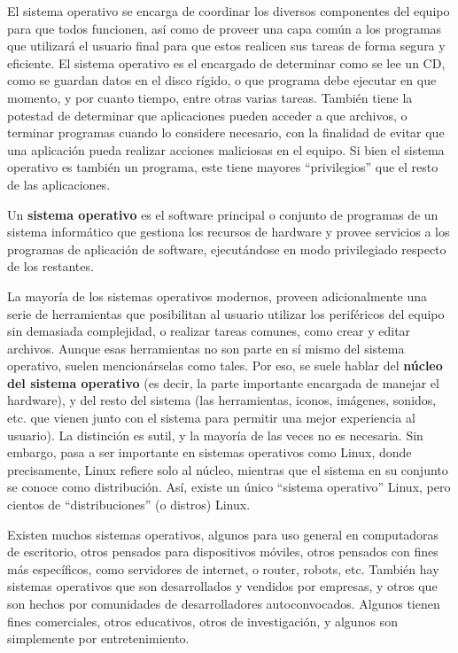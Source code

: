 El sistema operativo se encarga de coordinar los diversos componentes del equipo
para que todos funcionen, así como de proveer una capa común a los programas que
utilizará el usuario final para que estos realicen sus tareas de forma segura y
eficiente. El sistema operativo es el encargado de determinar como se lee un CD,
como se guardan datos en el disco rígido, o que programa debe ejecutar en que
momento, y por cuanto tiempo, entre otras varias tareas. También tiene la
potestad de determinar que aplicaciones pueden acceder a que archivos, o
terminar programas cuando lo considere necesario, con la finalidad de evitar que
una aplicación pueda realizar acciones maliciosas en el equipo. Si bien el
sistema operativo es también un programa, este tiene mayores ``privilegios'' que
el resto de las aplicaciones.

\begin{definition} Un \textbf{sistema operativo} es el
    software principal o conjunto de programas de un sistema informático que
    gestiona los recursos de hardware y provee servicios a los programas de
    aplicación de software, ejecutándose en modo privilegiado respecto de los
    restantes.
    \autocite[cft.]{tanenbaum_2007, turner_1986}
\end{definition}

La mayoría de los sistemas operativos modernos, proveen adicionalmente una serie
de herramientas que posibilitan al usuario utilizar los periféricos del equipo
sin demasiada complejidad, o realizar tareas comunes, como crear y editar
archivos. Aunque esas herramientas no son parte en sí mismo del sistema
operativo, suelen mencionárselas como tales. Por eso, se suele hablar del
\textbf{núcleo del sistema operativo} (es decir, la parte importante encargada
de manejar el hardware), y del resto del sistema (las herramientas, iconos,
imágenes, sonidos, etc. que vienen junto con el sistema para permitir una mejor
experiencia al usuario). La distinción es sutil, y la mayoría de las veces no es
necesaria. Sin embargo, pasa a ser importante en sistemas operativos como Linux,
donde precisamente, Linux refiere solo al núcleo, mientras que el sistema en su
conjunto se conoce como distribución. Así, existe un único ``sistema operativo''
Linux, pero cientos de ``distribuciones'' (o distros) Linux.

Existen muchos sistemas operativos, algunos para uso general en computadoras de
escritorio, otros pensados para dispositivos móviles, otros pensados con fines
más específicos, como servidores de internet, o router, robots, etc. También hay
sistemas operativos que son desarrollados y vendidos por empresas, y otros que
son hechos por comunidades de desarrolladores autoconvocados. Algunos tienen
fines comerciales, otros educativos, otros de investigación, y algunos son
simplemente por entretenimiento.

